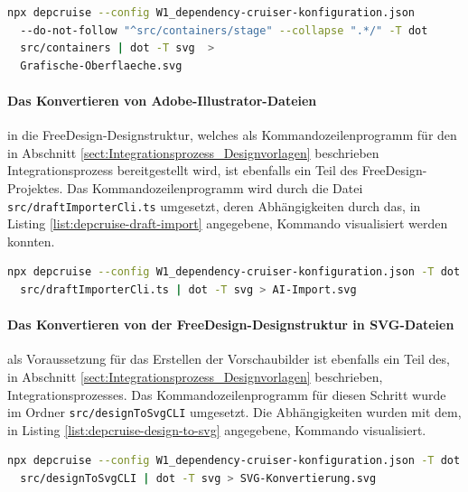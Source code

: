 \begin{lstlisting}[language={sh}, label=depcruise-gui, caption=Visualisierung der Zusammenhänge der grafischen Elemente des Editors]
npx depcruise --config W1_dependency-cruiser-konfiguration.json 
  --do-not-follow "^src/containers/stage" --collapse ".*/" -T dot 
  src/containers | dot -T svg  > 
  Grafische-Oberflaeche.svg
\end{lstlisting}

\paragraph{Das Konvertieren von Adobe-Illustrator-Dateien} in die FreeDesign-Designstruktur, welches als Kommandozeilenprogramm für den in Abschnitt \ref{sect:Integrationsprozess_Designvorlagen} beschrieben Integrationsprozess bereitgestellt wird, ist ebenfalls ein Teil des FreeDesign-Projektes. 
Das Kommandozeilenprogramm wird durch die Datei \lstinline|src/draftImporterCli.ts| umgesetzt, deren Abhängigkeiten durch das, in Listing \ref{list:depcruise-draft-import} angegebene, Kommando visualisiert werden konnten.
\begin{lstlisting}[language={sh}, label=list:depcruise-draft-import, caption=Visualisierung der Abhängigkeiten des Programms zum Import der AI-Dateien]
npx depcruise --config W1_dependency-cruiser-konfiguration.json -T dot 
  src/draftImporterCli.ts | dot -T svg > AI-Import.svg
\end{lstlisting}

\paragraph{Das Konvertieren von der FreeDesign-Designstruktur in SVG-Dateien} als Voraussetzung für das Erstellen der Vorschaubilder ist ebenfalls ein Teil des, in Abschnitt \ref{sect:Integrationsprozess_Designvorlagen} beschrieben, Integrationsprozesses.  
Das Kommandozeilenprogramm für diesen Schritt wurde im Ordner \lstinline|src/designToSvgCLI| umgesetzt. Die Abhängigkeiten wurden mit dem, in Listing \ref{list:depcruise-design-to-svg} angegebene, Kommando visualisiert.
\begin{lstlisting}[language={sh}, label=list:depcruise-design-to-svg, caption=Visualisierung des Kommandozeilenprogramms designToSvgCLI]
npx depcruise --config W1_dependency-cruiser-konfiguration.json -T dot 
  src/designToSvgCLI | dot -T svg > SVG-Konvertierung.svg
\end{lstlisting}

